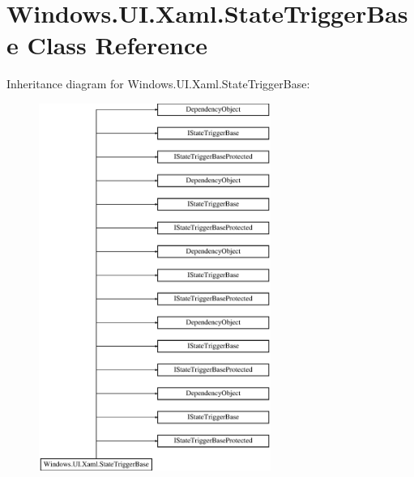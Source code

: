 \hypertarget{class_windows_1_1_u_i_1_1_xaml_1_1_state_trigger_base}{}\section{Windows.\+U\+I.\+Xaml.\+State\+Trigger\+Base Class Reference}
\label{class_windows_1_1_u_i_1_1_xaml_1_1_state_trigger_base}
Inheritance diagram for Windows.\+U\+I.\+Xaml.\+State\+Trigger\+Base\+:\begin{figure}[H]
\begin{center}
\leavevmode
\includegraphics[height=12.000000cm]{class_windows_1_1_u_i_1_1_xaml_1_1_state_trigger_base}
\end{center}
\end{figure}
